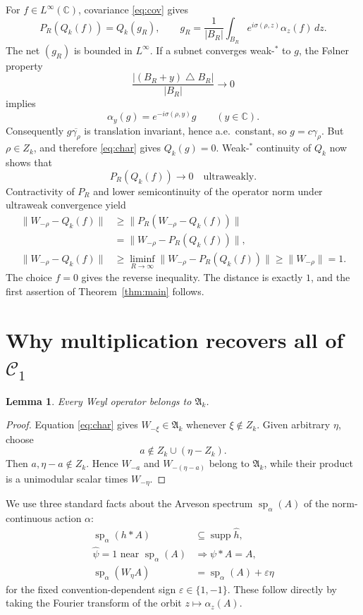 \documentclass[10pt]{article}
\newtheorem{lemma}{Lemma}
\newcommand{\C}{\mathbb C}
\newcommand{\cA}{\mathfrak A}
\begin{document}
For \(f\in L^\infty(\C)\), covariance \eqref{eq:cov} gives
\[
 P_R(Q_k(f))=Q_k(g_R),\qquad
 g_R=\frac1{|B_R|}\int_{B_R}
 e^{i\sigma(\rho,z)}\alpha_z(f)\,dz .
\]
The net \((g_R)\) is bounded in \(L^\infty\). If a subnet converges weak-\(^*\) to \(g\), the Følner property
\[
 \frac{|(B_R+y)\mathbin{\triangle}B_R|}{|B_R|}\longrightarrow0
\]
implies
\[
 \alpha_y(g)=e^{-i\sigma(\rho,y)}g\qquad(y\in\C).
\]
Consequently \(g\overline{\gamma_\rho}\) is translation invariant, hence a.e.\ constant, so \(g=c\gamma_\rho\). But \(\rho\in Z_k\), and therefore \eqref{eq:char} gives \(Q_k(g)=0\). Weak-\(^*\) continuity of \(Q_k\) now shows that
\[
 P_R(Q_k(f))\longrightarrow0
 \quad\text{ultraweakly}.
\]
Contractivity of \(P_R\) and lower semicontinuity of the operator norm under ultraweak convergence yield
\begin{align*}
 \|W_{-\rho}-Q_k(f)\|
 &\geq \|P_R(W_{-\rho}-Q_k(f))\|\\
 &=\|W_{-\rho}-P_R(Q_k(f))\|,\\
 \|W_{-\rho}-Q_k(f)\|
 &\geq\liminf_{R\to\infty}
 \|W_{-\rho}-P_R(Q_k(f))\|
 \geq\|W_{-\rho}\|=1.
\end{align*}
The choice \(f=0\) gives the reverse inequality. The distance is exactly \(1\), and the first assertion of Theorem~\ref{thm:main} follows.

\section*{Why multiplication recovers all of \(\mathcal C_1\)}

\begin{lemma}\label{lem:weyl}
Every Weyl operator belongs to \(\cA_k\).
\end{lemma}

\begin{proof}
Equation \eqref{eq:char} gives \(W_{-\xi}\in\cA_k\) whenever \(\xi\notin Z_k\). Given arbitrary \(\eta\), choose
\[
 a\notin Z_k\cup(\eta-Z_k).
\]
Then \(a,\eta-a\notin Z_k\). Hence \(W_{-a}\) and \(W_{-(\eta-a)}\) belong to \(\cA_k\), while their product is a unimodular scalar times \(W_{-\eta}\).
\end{proof}

We use three standard facts about the Arveson spectrum
\(\operatorname{sp}_\alpha(A)\) of the norm-continuous action \(\alpha\):
\begin{equation}\label{eq:specfacts}
\begin{split}
 \operatorname{sp}_\alpha(h*A)&\subseteq\operatorname{supp}\widehat h,\\
 \widehat\psi=1\text{ near }\operatorname{sp}_\alpha(A)
 &\Longrightarrow\psi*A=A,\\
 \operatorname{sp}_\alpha(W_\eta A)
 &=\operatorname{sp}_\alpha(A)+\varepsilon\eta
\end{split}
\end{equation}
for the fixed convention-dependent sign \(\varepsilon\in\{1,-1\}\). These follow directly by taking the Fourier transform of the orbit \(z\mapsto\alpha_z(A)\).
\end{document}
